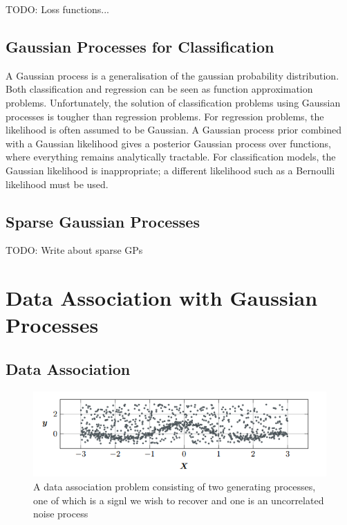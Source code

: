 \documentclass[12pt,a4paper]{report}
\theoremstyle{definition}
\begin{document}
TODO: Loss functions...

\subsection{Gaussian Processes for Classification}

A Gaussian process is a generalisation of the gaussian probability distribution. 
Both classification and regression can be seen as function approximation problems. 
Unfortunately, the solution of classification problems using Gaussian processes is tougher than regression problems. 
For regression problems, the likelihood is often assumed to be Gaussian. 
A Gaussian process prior combined with a Gaussian likelihood gives a posterior Gaussian process over functions, where everything remains analytically tractable. 
For classification models, the Gaussian likelihood is inappropriate; a different likelihood such as a Bernoulli likelihood must be used.

\subsection{Sparse Gaussian Processes}

TODO: Write about sparse GPs

\section{Data Association with Gaussian Processes}

\subsection{Data Association}

\begin{figure}[H]
    \centering
    \includegraphics[width=\linewidth]{data_association_problem.png}
    \caption{A data association problem consisting of two generating processes, one of which is a signl we wish to recover and one is an uncorrelated noise process \citep{Kaiser2018}}
    \label{fig:DataAssocProblem}
\end{figure}
\end{document}
